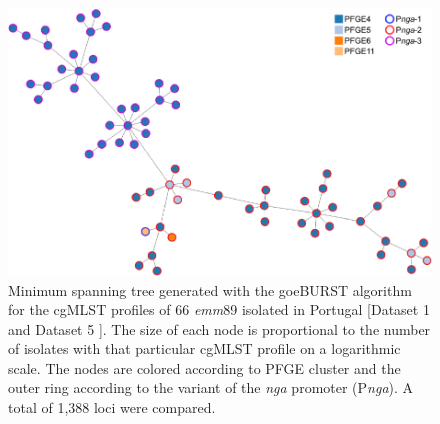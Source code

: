 \newpage
\begin{figure}[!ht]
    \centering
    \includegraphics[angle=0,width=\textwidth]{figures/chapter 4/FigureS16.pdf}
    \caption[Minimum spanning tree generated with the goeBURST algorithm for the cgMLST profiles of 66 \textit{emm}89 isolated in Portugal.]{Minimum spanning tree generated with the goeBURST algorithm for the \ac{cgMLST} profiles of 66 \textit{emm}89 isolated in Portugal [Dataset 1 and Dataset 5 \cite{friaes_supplemental_2023}]. The size of each node is proportional to the number of isolates with that particular \ac{cgMLST} profile on a logarithmic scale. The nodes are colored according to \ac{PFGE} cluster and the outer ring according to the variant of the \textit{nga} promoter (P\textit{nga}). A total of 1,388 loci were compared.}
    \label{fig:chap4_figureS16}
\end{figure}

